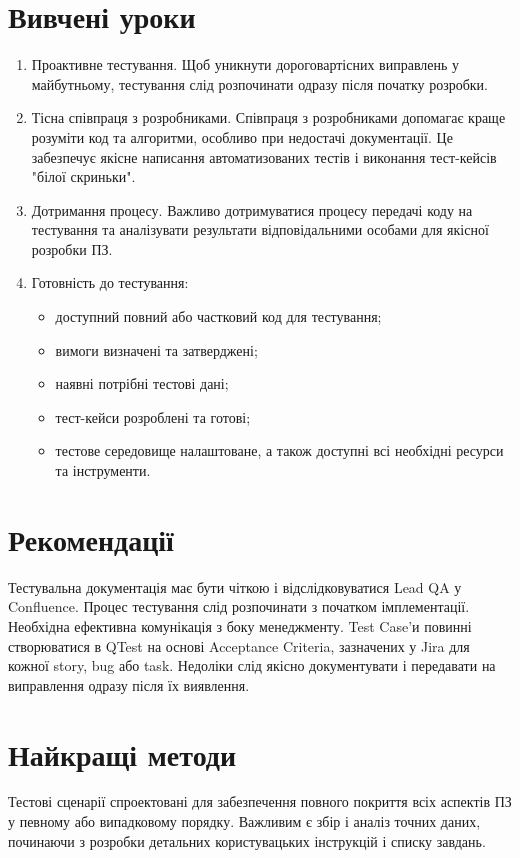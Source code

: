 \documentclass[oneside,14pt]{extarticle}
\begin{document}
\begin{normalsize}
	\section{Вивчені уроки}
	\begin{enumerate}
		\item Проактивне тестування. Щоб уникнути дороговартісних виправлень у майбутньому, тестування слід розпочинати одразу після початку розробки.
		\item Тісна співпраця з розробниками. Співпраця з розробниками допомагає краще розуміти код та алгоритми, особливо при недостачі документації. Це забезпечує якісне написання автоматизованих тестів і виконання тест-кейсів "білої скриньки".
		\item Дотримання процесу. Важливо дотримуватися процесу передачі коду на тестування та аналізувати результати відповідальними особами для якісної розробки ПЗ.
		\item Готовність до тестування:
		\begin{itemize}
			\item доступний повний або частковий код для тестування;
			\item вимоги визначені та затверджені;
			\item наявні потрібні тестові дані;
			\item тест-кейси розроблені та готові;
			\item тестове середовище налаштоване, а також доступні всі необхідні ресурси та інструменти.
		\end{itemize}
	\end{enumerate}
	
	\section{Рекомендації}
	Тестувальна документація має бути чіткою і відслідковуватися Lead QA у Confluence. Процес тестування слід розпочинати з початком імплементації. Необхідна ефективна комунікація з боку менеджменту. Test Case'и повинні створюватися в QTest на основі Acceptance Criteria, зазначених у Jira для кожної story, bug або task. Недоліки слід якісно документувати і передавати на виправлення одразу після їх виявлення.
	
	\section{Найкращі методи}
	Тестові сценарії спроектовані для забезпечення повного покриття всіх аспектів ПЗ у певному або випадковому порядку. Важливим є збір і аналіз точних даних, починаючи з розробки детальних користувацьких інструкцій і списку завдань.
	

\end{normalsize}
\end{document}
